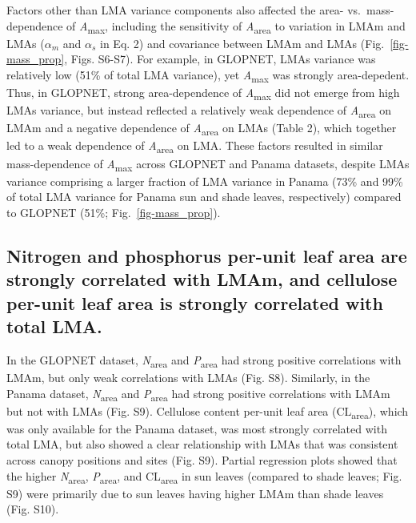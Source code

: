 \documentclass[
  12pt,
  letterpaper,
  DIV=11,
  numbers=noendperiod]{scrartcl}
\begin{document}
Factors other than LMA variance components also affected the area-
vs.~mass-dependence of \emph{A}\textsubscript{max}, including the
sensitivity of \emph{A}\textsubscript{area} to variation in LMAm and
LMAs (\(\alpha_m\) and \(\alpha_s\) in Eq. 2) and covariance between
LMAm and LMAs (Fig.~\ref{fig-mass_prop}, Figs. S6-S7). For example, in
GLOPNET, LMAs variance was relatively low (51\% of total LMA variance),
yet \emph{A}\textsubscript{max} was strongly area-depedent. Thus, in
GLOPNET, strong area-dependence of \emph{A}\textsubscript{max} did not
emerge from high LMAs variance, but instead reflected a relatively weak
dependence of \emph{A}\textsubscript{area} on LMAm and a negative
dependence of \emph{A}\textsubscript{area} on LMAs (Table 2), which
together led to a weak dependence of \emph{A}\textsubscript{area} on
LMA. These factors resulted in similar mass-dependence of
\emph{A}\textsubscript{max} across GLOPNET and Panama datasets, despite
LMAs variance comprising a larger fraction of LMA variance in Panama
(73\% and 99\% of total LMA variance for Panama sun and shade leaves,
respectively) compared to GLOPNET (51\%; Fig.~\ref{fig-mass_prop}).

\subsection{Nitrogen and phosphorus per-unit leaf area are strongly
correlated with LMAm, and cellulose per-unit leaf area is strongly
correlated with total
LMA.}\label{nitrogen-and-phosphorus-per-unit-leaf-area-are-strongly-correlated-with-lmam-and-cellulose-per-unit-leaf-area-is-strongly-correlated-with-total-lma.}

In the GLOPNET dataset, \emph{N}\textsubscript{area} and
\emph{P}\textsubscript{area} had strong positive correlations with LMAm,
but only weak correlations with LMAs (Fig. S8). Similarly, in the Panama
dataset, \emph{N}\textsubscript{area} and \emph{P}\textsubscript{area}
had strong positive correlations with LMAm but not with LMAs (Fig. S9).
Cellulose content per-unit leaf area (CL\textsubscript{area}), which was
only available for the Panama dataset, was most strongly correlated with
total LMA, but also showed a clear relationship with LMAs that was
consistent across canopy positions and sites (Fig. S9). Partial
regression plots showed that the higher \emph{N}\textsubscript{area},
\emph{P}\textsubscript{area}, and CL\textsubscript{area} in sun leaves
(compared to shade leaves; Fig. S9) were primarily due to sun leaves
having higher LMAm than shade leaves (Fig. S10).
\end{document}
